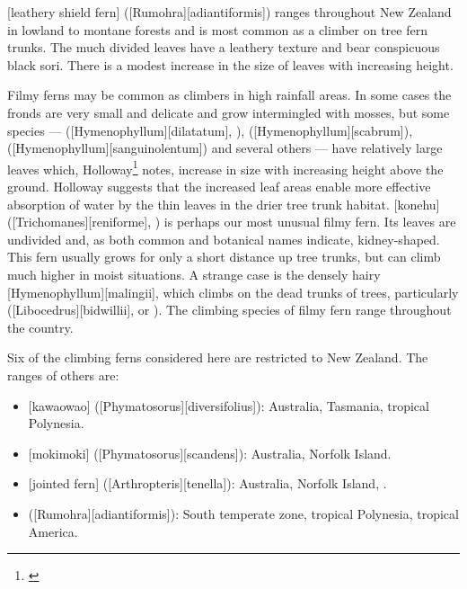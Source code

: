 [leathery shield fern] ([Rumohra][adiantiformis]) ranges throughout New Zealand in lowland to montane forests and is most common as a climber on tree fern trunks.
The much divided leaves have a leathery texture and bear conspicuous black sori.
There is a modest increase in the size of leaves with increasing height.

Filmy ferns may be common as climbers in high rainfall areas.
In some cases the fronds are very small and delicate and grow intermingled with mosses, but some species ---  ([Hymenophyllum][dilatatum], ),  ([Hymenophyllum][scabrum]),  ([Hymenophyllum][sanguinolentum]) and several others --- have relatively large leaves which, Holloway\footnote{\cite{holloway1923studies}} notes, increase in size with increasing height above the ground.
Holloway suggests that the increased leaf areas enable more effective absorption of water by the thin leaves in the drier tree trunk habitat.
[konehu] ([Trichomanes][reniforme], ) is perhaps our most unusual filmy fern.
Its leaves are undivided and, as both common and botanical names indicate, kidney-shaped.
This fern usually grows for only a short distance up tree trunks, but can climb much higher in moist situations.
A strange case is the densely hairy  [Hymenophyllum][malingii], which climbs on the dead trunks of trees, particularly  ([Libocedrus][bidwillii],  or ).
The climbing species of filmy fern range throughout the country.

Six of the climbing ferns considered here are restricted to New Zealand.
The ranges of others are:

\begin{itemize}
	\item {}[kawaowao] ([Phymatosorus][diversifolius]): Australia, Tasmania, tropical Polynesia.
	\item {}[mokimoki] ([Phymatosorus][scandens]): Australia, Norfolk Island.
	\item {}[jointed fern] ([Arthropteris][tenella]): Australia, Norfolk Island, .
	\item {} ([Rumohra][adiantiformis]): South temperate zone, tropical Polynesia, tropical America.
\end{itemize}

